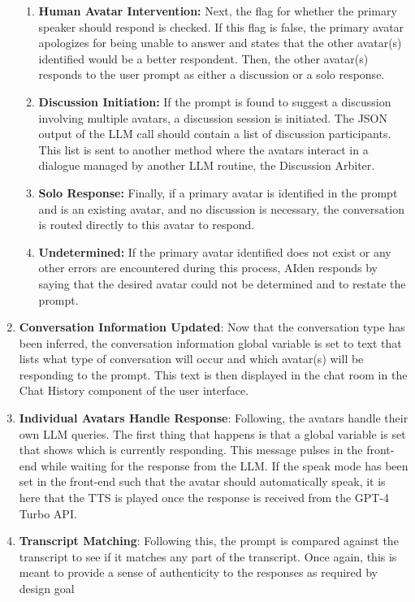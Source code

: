 \documentclass[12pt]{report}
\begin{document}
\begin{myfont}
\begin{enumerate}
\begin{enumerate}
                \item \textbf{Human Avatar Intervention:} Next, the flag for whether the primary speaker should respond is checked. If this flag is false, the primary avatar apologizes for being unable to answer and states that the other avatar(s) identified would be a better respondent. Then, the other avatar(s) responds to the user prompt as either a discussion or a solo response. 
                \item \textbf{Discussion Initiation:} If the prompt is found to suggest a discussion involving multiple avatars, a discussion session is initiated. The JSON output of the LLM call should contain a list of discussion participants. This list is sent to another method where the avatars interact in a dialogue managed by another LLM routine, the Discussion Arbiter.
                \item \textbf{Solo Response:} Finally, if a primary avatar is identified in the prompt and is an existing avatar, and no discussion is necessary, the conversation is routed directly to this avatar to respond. 
                \item \textbf{Undetermined:} If the primary avatar identified does not exist or any other errors are encountered during this process, AIden responds by saying that the desired avatar could not be determined and to restate the prompt.
            \end{enumerate}
            \item \textbf{Conversation Information Updated}: Now that the conversation type has been inferred, the conversation information global variable is set to text that lists what type of conversation will occur and which avatar(s) will be responding to the prompt. This text is then displayed in the chat room in the Chat History component of the user interface.
            \item \textbf{Individual Avatars Handle Response}: Following, the avatars handle their own LLM queries. The first thing that happens is that a global variable is set that shows which is currently responding. This message pulses in the front-end while waiting for the response from the LLM. If the speak mode has been set in the front-end such that the avatar should automatically speak, it is here that the TTS is played once the response is received from the GPT-4 Turbo API. 
            \item \textbf{Transcript Matching}: Following this, the prompt is compared against the transcript to see if it matches any part of the transcript. Once again, this is meant to provide a sense of authenticity to the responses as required by design goal 

\end{enumerate}
\end{myfont}
\end{document}
